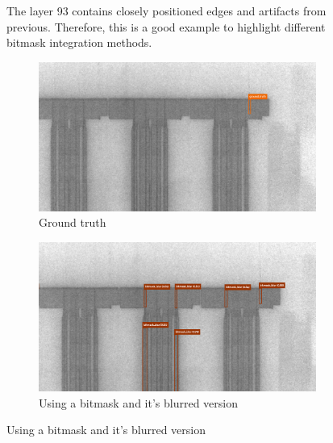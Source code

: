 \begin{figure}[!h]
  \caption{The layer 93 contains closely positioned edges and artifacts from previous. Therefore, this is a good example to highlight different bitmask integration methods. }
  \label{impl:layer_example}
\end{figure}

\begin{figure}[!h]
\centering
\begin{subfigure}{.9\textwidth}
  \centering
  \includegraphics[width=\linewidth]{images/implementation/results/bm/gt}
  \caption{Ground truth}
\end{subfigure}

\begin{subfigure}{.9\textwidth}
  \centering
  \includegraphics[width=\linewidth]{images/implementation/results/bm/bm_blur}
  \caption{Using a bitmask and it's blurred version}
\end{subfigure}


\end{figure}
